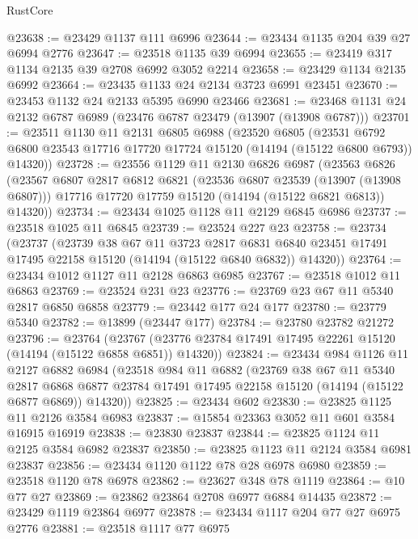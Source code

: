 \begin{lexlean}{RustCore}
\begin{coremodule}
@23638 := @23429 @1137 @111 @6996
@23644 := @23434 @1135 @204 @39 @27 @6994 @2776
@23647 := @23518 @1135 @39 @6994
@23655 := @23419 @317 @1134 @2135 @39 @2708 @6992 @3052 @2214
@23658 := @23429 @1134 @2135 @6992
@23664 := @23435 @1133 @24 @2134 @3723 @6991 @23451
@23670 := @23453 @1132 @24 @2133 @5395 @6990 @23466
@23681 := @23468 @1131 @24 @2132 @6787 @6989 (@23476 @6787 @23479 (@13907 (@13908 @6787)))
@23701 := @23511
    @1130
    @11
    @2131
    @6805
    @6988
    (@23520
      @6805
      (@23531 @6792 @6800 @23543 @17716 @17720 @17724 @15120 (@14194 (@15122 @6800 @6793)) @14320))
@23728 := @23556
    @1129
    @11
    @2130
    @6826
    @6987
    (@23563
      @6826
      (@23567
        @6807
        @2817
        @6812
        @6821
        (@23536 @6807 @23539 (@13907 (@13908 @6807)))
        @17716
        @17720
        @17759
        @15120
        (@14194 (@15122 @6821 @6813))
        @14320))
@23734 := @23434 @1025 @1128 @11 @2129 @6845 @6986
@23737 := @23518 @1025 @11 @6845
@23739 := @23524 @227 @23
@23758 := @23734
    (@23737
      (@23739
        @38
        @67
        @11
        @3723
        @2817
        @6831
        @6840
        @23451
        @17491
        @17495
        @22158
        @15120
        (@14194 (@15122 @6840 @6832))
        @14320))
@23764 := @23434 @1012 @1127 @11 @2128 @6863 @6985
@23767 := @23518 @1012 @11 @6863
@23769 := @23524 @231 @23
@23776 := @23769 @23 @67 @11 @5340 @2817 @6850 @6858
@23779 := @23442 @177 @24 @177
@23780 := @23779 @5340
@23782 := @13899 (@23447 @177)
@23784 := @23780 @23782 @21272
@23796 := @23764
    (@23767 (@23776 @23784 @17491 @17495 @22261 @15120 (@14194 (@15122 @6858 @6851)) @14320))
@23824 := @23434
    @984
    @1126
    @11
    @2127
    @6882
    @6984
    (@23518
      @984
      @11
      @6882
      (@23769
        @38
        @67
        @11
        @5340
        @2817
        @6868
        @6877
        @23784
        @17491
        @17495
        @22158
        @15120
        (@14194 (@15122 @6877 @6869))
        @14320))
@23825 := @23434 @602
@23830 := @23825 @1125 @11 @2126 @3584 @6983
@23837 := @15854 @23363 @3052 @11 @601 @3584 @16915 @16919
@23838 := @23830 @23837
@23844 := @23825 @1124 @11 @2125 @3584 @6982 @23837
@23850 := @23825 @1123 @11 @2124 @3584 @6981 @23837
@23856 := @23434 @1120 @1122 @78 @28 @6978 @6980
@23859 := @23518 @1120 @78 @6978
@23862 := @23627 @348 @78 @1119
@23864 := @10 @77 @27
@23869 := @23862 @23864 @2708 @6977 @6884 @14435
@23872 := @23429 @1119 @23864 @6977
@23878 := @23434 @1117 @204 @77 @27 @6975 @2776
@23881 := @23518 @1117 @77 @6975

\end{coremodule}
\end{lexlean}
